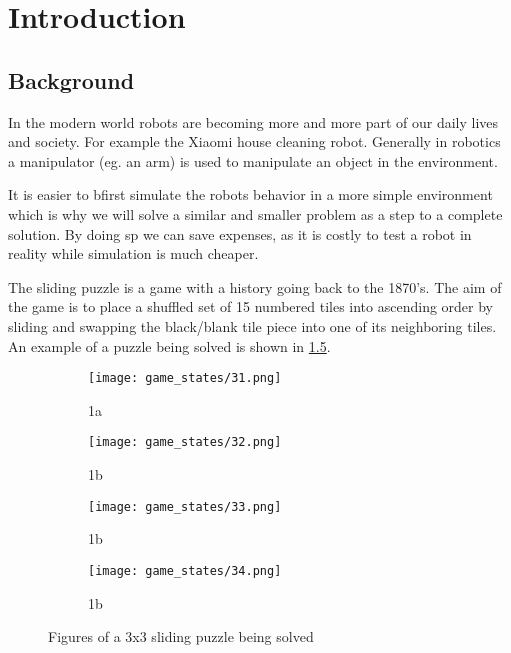 \graphicspath{{introduction/fig/}}

\chapter{Introduction}
\label{chap:introduction}

\section{Background}
In the modern world robots are becoming more and more part of our daily lives and society. For example the Xiaomi house cleaning robot.
Generally in robotics a manipulator (eg.
an arm) is used to manipulate an object in
the environment.

It is easier to bfirst simulate the robots behavior in a
more simple environment which is why we will solve a similar and smaller problem as a step to a complete solution. By doing sp we can save expenses, as it is costly to test a robot in reality while simulation is much cheaper. \newline

The sliding puzzle is a game with a history going back to the 1870's. The aim of the game is to place a shuffled set of 15 numbered tiles into ascending order by sliding and swapping the black/blank tile piece into one of its neighboring tiles. An example of a puzzle being solved is shown in \ref{fig:sliding_puzzle_figs}.

\begin{figure}
	\centering
	\begin{subfigure}{.2\textwidth}
		\centering
		\texttt{[image: game\_states/31.png]}
		\caption{1a}
		\label{fig:sfig1}
	\end{subfigure}%
	\begin{subfigure}{.2\textwidth}
		\centering
		\texttt{[image: game\_states/32.png]}
		\caption{1b}
		\label{fig:sfig2}
	\end{subfigure}
	\begin{subfigure}{.2\textwidth}
		\centering
		\texttt{[image: game\_states/33.png]}
		\caption{1b}
		\label{fig:sfig3}
	\end{subfigure}
	\begin{subfigure}{.2\textwidth}
		\centering
		\texttt{[image: game\_states/34.png]}
		\caption{1b}
		\label{fig:sfig4}
	\end{subfigure}
	\caption{Figures of a 3x3 sliding puzzle being solved}
	\label{fig:sliding_puzzle_figs}
\end{figure}

